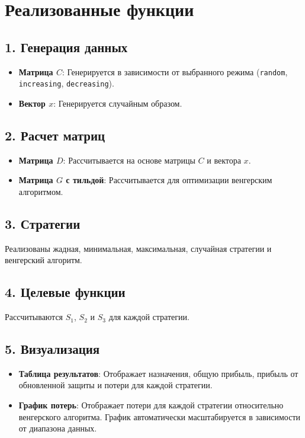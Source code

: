 \documentclass{article}
\begin{document}
\section*{Реализованные функции}

\subsection*{1. Генерация данных}
\begin{itemize}
    \item \textbf{Матрица \( C \)}: Генерируется в зависимости от выбранного режима (\texttt{random}, \texttt{increasing}, \texttt{decreasing}).
    \item \textbf{Вектор \( x \)}: Генерируется случайным образом.
\end{itemize}

\subsection*{2. Расчет матриц}
\begin{itemize}
    \item \textbf{Матрица \( D \)}: Рассчитывается на основе матрицы \( C \) и вектора \( x \).
    \item \textbf{Матрица \( G \) с тильдой}: Рассчитывается для оптимизации венгерским алгоритмом.
\end{itemize}

\subsection*{3. Стратегии}
Реализованы жадная, минимальная, максимальная, случайная стратегии и венгерский алгоритм.

\subsection*{4. Целевые функции}
Рассчитываются \( S_1 \), \( S_2 \) и \( S_3 \) для каждой стратегии.

\subsection*{5. Визуализация}
\begin{itemize}
    \item \textbf{Таблица результатов}: Отображает назначения, общую прибыль, прибыль от обновленной защиты и потери для каждой стратегии.
    \item \textbf{График потерь}: Отображает потери для каждой стратегии относительно венгерского алгоритма. График автоматически масштабируется в зависимости от диапазона данных.
\end{itemize}
\end{document}
